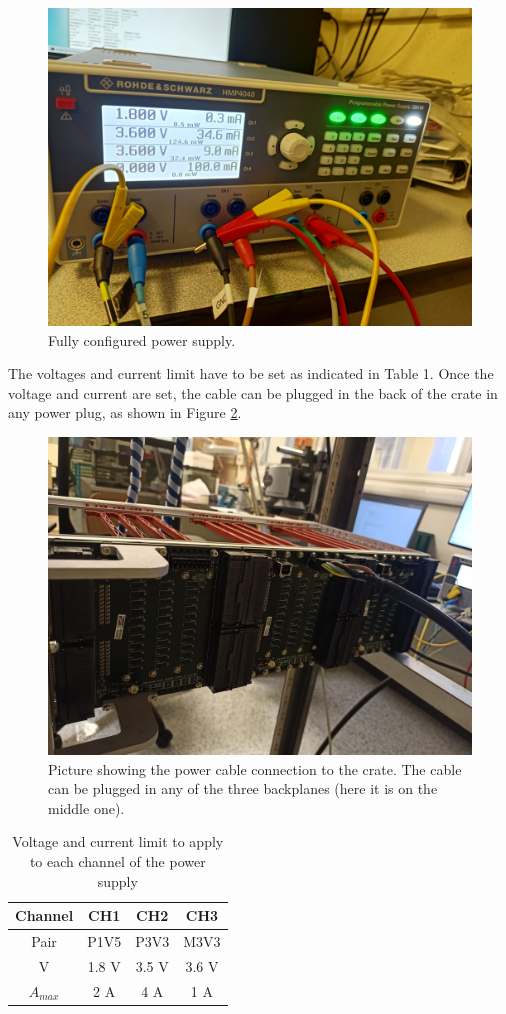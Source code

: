 \documentclass[10pt,a4paper]{article}
\begin{document}
\begin{figure}[h!]
\centering
 \includegraphics[width=0.7\linewidth]{PowerSupply.jpeg} 
  \caption{Fully configured power supply.}
  \label{PhotoPowerConnection}
\end{figure}

The voltages and current limit have to be set as indicated in Table 1. Once the voltage and current are set, the cable can be plugged in the back of the crate in any power plug, as shown in Figure \ref{PhotoPowerConnectionCrate}.

\begin{figure}[h!]
\centering
 \includegraphics[width=0.7\linewidth]{PowerCable.jpeg} 
  \caption{Picture showing the power cable connection to the crate. The cable can be plugged in any of the three backplanes (here it is on the middle one).}
  \label{PhotoPowerConnectionCrate}
\end{figure}

\begin{table}[h!]
\centering
\begin{tabular}{|c|c|c|c|}
\hline 
Channel & CH1 & CH2 & CH3 \\ 
\hline 
Pair & P1V5 & P3V3 & M3V3 \\ 
\hline 
V & 1.8 V & 3.5 V & 3.6 V \\ 
$A_{max}$ & 2 A & 4 A & 1 A \\ 
\hline 
\end{tabular} 
\label{tableIV}
\caption{Voltage and current limit to apply to each channel of the power supply}
\end{table}
\end{document}
